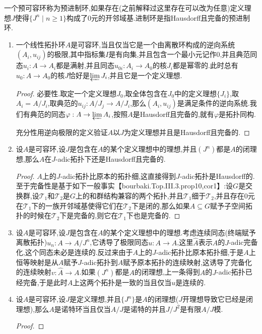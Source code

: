 一个预可容环称为预进制环,如果存在(之前解释过这里存在可以改为任意)定义理想$J$使得$\{J^n\mid n\ge1\}$构成了0元的开邻域基.进制环是指Hausdorff且完备的预进制环.
\begin{enumerate}
	\item 一个线性拓扑环$A$是可容环,当且仅当它是一个由离散环构成的逆向系统$(A_i,u_{ij})$的极限,其中指标集$I$是有向集,并且包含一个最小元记作0,并且典范同态$u_i:A\to A_i$都是满射,并且同态$u_{0i}:A_i\to A_0$的核$J_i$都是幂零的.此时总有$u_0:A\to A_0$的核$J$恰好是$\varprojlim J_i$,并且它是一个定义理想.
	\begin{proof}
		
		必要性.取定一个定义理想$J_0$,取全体包含在$J_0$中的定义理想$\{J_i\}$,取$A_i=A/J_i$,取典范的$u_{ij}:A/J_j\to A/J_i$,那么$(A_i,u_{ij})$是满足条件的逆向系统.我们有典范的同态$\varphi:A\to\varprojlim A_i$,按照$A$是Hausdorff且完备的,就有$\varphi$是拓扑同构.
		
		\qquad
		
		充分性用逆向极限的定义验证$A$以$J$为定义理想并且是Hausdorff且完备的.
	\end{proof}
	\item 设$A$是可容环,设$J$是包含在$A$的某个定义理想中的理想,并且$(J^n)$都是$A$的闭理想,那么$A$在$J$-adic拓扑下还是Hausdorff且完备的.
	\begin{proof}
		
		$A$上的$J$-adic拓扑比原本的拓扑细,这直接得到$J$-adic拓扑是Hausdorff的.至于完备性是基于如下一般事实【bourbaki.Top.III.3.prop10,cor1】:设$G$是交换群,设$\mathscr{T}_1$和$\mathscr{T}_2$是$G$上的和群结构兼容的两个拓扑,并且$\mathscr{T}_1$细于$\mathscr{T}_2$,并且存在0元在$\mathscr{T}_1$下的一族开邻域基使得它们在$\mathscr{T}_2$下是闭的,那么如果$A\subseteq G$赋予子空间拓扑的时候在$\mathscr{T}_2$下是完备的,则它在$\mathscr{T}_1$下也是完备的.
	\end{proof}
	\item 设$A$是可容环,设$J$是包含在$A$的某个定义理想中的理想.考虑连续同态(终端赋予离散拓扑)$u_n:A\to A/J^n$,它诱导了极限同态$u:A\to\widehat{A}$,这里$\widehat{A}$表示$A$的$J$-adic完备化,这个同态未必是连续的.反过来由于$A$上的$J$-adic拓扑比原本拓扑细,于是$A$上恒等映射是从$A$赋予$J$-adic拓扑到$A$赋予原本拓扑的连续映射,这诱导了完备化的连续映射$v:\widehat{A}\to A$.如果$(J^n)$都是$A$的闭理想,上一条得到$A$的$J$-adic拓扑已经完备,于是此时$A$上这两个拓扑是一致的当且仅当$u$是连续的.
	\item 设$A$是可容环,设$J$是定义理想,并且$\{J^n\}$是$A$的闭理想($J$开理想导致它已经是闭理想),那么$A$是诺特环当且仅当$A/J$是诺特的并且$J/J^2$是有限$A/J$模.
	\begin{proof}
		

\end{proof}
\end{enumerate}
